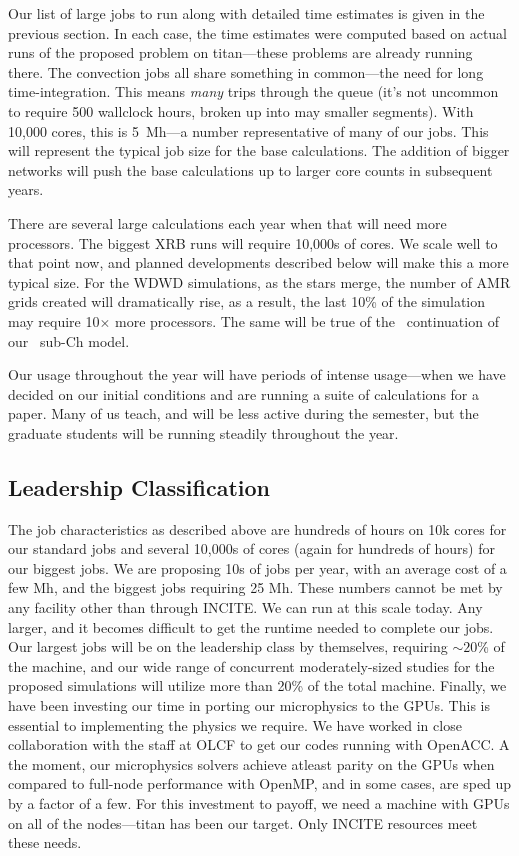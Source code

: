 Our list of large jobs to run along with detailed time estimates is
given in the previous section.  In each case, the time estimates were
computed based on actual runs of the proposed problem on titan---these
problems are already running there.  The convection jobs all share
something in common---the need for long time-integration.  This means
{\em many} trips through the queue (it's not uncommon to require 500
wallclock hours, broken up into may smaller segments).  With 10,000
cores, this is 5~Mh---a number representative of many of our jobs.
This will represent the typical job size for the base calculations.
The addition of bigger networks will push the base calculations up to
larger core counts in subsequent years.

There are several large calculations each year when that will need more
processors.  The biggest XRB runs will require 10,000s of cores.  We
scale well to that point now, and planned developments described
below will make this a more typical size.  For the WDWD simulations,
as the stars merge, the number of AMR grids created will dramatically
rise, as a result, the last 10\% of the simulation may require
10$\times$ more processors.  The same will be true of the
\castro\ continuation of our \maestro\ sub-Ch model.

Our usage throughout the year will have periods of intense
usage---when we have decided on our initial conditions and are running
a suite of calculations for a paper.  Many of us teach, and will be
less active during the semester, but the graduate students will be running
steadily throughout the year.


\subsection{Leadership Classification}

The job characteristics as described above are hundreds of hours on
10k cores for our standard jobs and several 10,000s of cores (again
for hundreds of hours) for our biggest jobs.  We are proposing 10s of
jobs per year, with an average cost of a few Mh, and the biggest jobs
requiring 25 Mh.  These numbers cannot be met by any facility other
than through INCITE.  We can run at this scale today.  Any larger, and
it becomes difficult to get the runtime needed to complete our jobs.
Our largest jobs will be on the leadership class by themselves,
requiring $\sim 20$\% of the machine, and our wide range of concurrent
moderately-sized studies for the proposed simulations will utilize
more than 20\% of the total machine.  Finally, we have been investing
our time in porting our microphysics to the GPUs.  This is essential
to implementing the physics we require.  We have worked in close
collaboration with the staff at OLCF to get our codes running with
OpenACC.  A the moment, our microphysics solvers achieve atleast
parity on the GPUs when compared to full-node performance with OpenMP,
and in some cases, are sped up by a factor of a few.  For this
investment to payoff, we need a machine with GPUs on all of the
nodes---titan has been our target.  Only INCITE resources meet these
needs.

